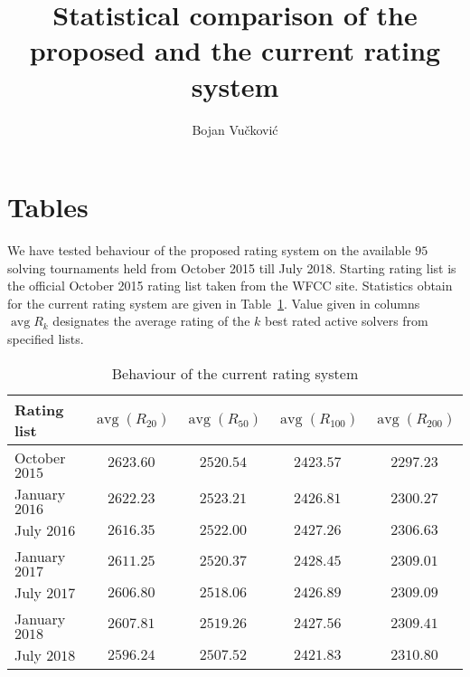 \documentclass[preprint,12pt]{article}
\newcommand{\ch}{\v{c}}
\newcommand{\tj}{\'c}
\DeclareMathOperator{\avg}{avg}
\begin{document}
\begin{titlepage}
\title{
	{Statistical comparison of the proposed and the current rating system}
	}
\author{Bojan Vu\ch kovi\tj}
\end{titlepage}
\maketitle

\section{Tables}

We have tested behaviour of the proposed rating system
on the available $95$ solving tournaments
held from October 2015 till July 2018.
Starting rating list is the official October 2015 rating list taken from the WFCC site.
Statistics obtain for the current rating system are given in Table~\ref{old_system}.
Value given in columns $\avg R_{k}$ designates the average rating of the $k$
best rated active solvers from specified lists.

\begin{table}[h]
\begin{center}
\begin{tabular}{|l|c|c|c|c|}
\hline
Rating list & $\avg (R_{20})$ & $\avg (R_{50})$ & $\avg (R_{100})$ & $\avg (R_{200})$\\
\hline
October $2015$ & $2623.60$ & $2520.54$ & $2423.57$ & $2297.23$\\
\hline
January $2016$ & $2622.23$ & $2523.21$ & $2426.81$ & $2300.27$\\
\hline
July $2016$ & $2616.35$ & $2522.00$ & $2427.26$ & $2306.63$\\
\hline
January $2017$ & $2611.25$ & $2520.37$ & $2428.45$ & $2309.01$\\
\hline
July $2017$ & $2606.80$ & $2518.06$ & $2426.89$ & $2309.09$\\
\hline
January $2018$ & $2607.81$ & $2519.26$ & $2427.56$ & $2309.41$\\
\hline
July $2018$ & $2596.24$ & $2507.52$ & $2421.83$ & $2310.80$\\
\hline
\end{tabular}
\caption{Behaviour of the current rating system}
\label{old_system}
\end{center}
\end{table}
\end{document}
